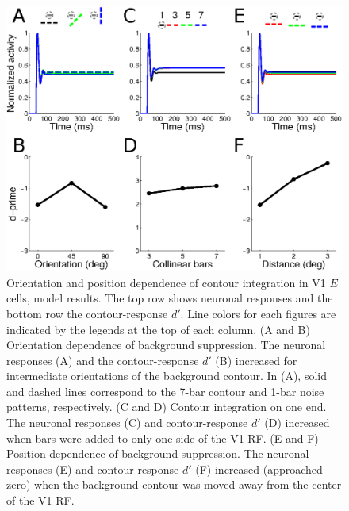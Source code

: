 \begin{figure}[t]
\begin{center}
\includegraphics[width=\textwidth]{Contour/figs/FigS2.eps}
\end{center}
\makeatletter
\let\@currsize\normalsize
\caption[Orientation and position dependence of contour integration in V1]{Orientation and position dependence of contour integration in
  V1 $E$ cells, model results. The top row shows neuronal responses
  and the bottom row the contour-response $d'$. Line colors for each
  figures are indicated by the legends at the top of each column. (A
  and B) Orientation dependence of background suppression. The
  neuronal responses (A) and the contour-response $d'$ (B) increased
  for intermediate orientations of the background contour.
  In (A), solid and
  dashed lines correspond to the 7-bar contour and 1-bar noise patterns, respectively.
  (C and D) Contour integration on one end. The neuronal responses (C)
  and contour-response $d'$ (D) increased when bars were added to only
  one side of the V1 RF. (E and F) Position dependence of background
  suppression.  The neuronal responses (E) and contour-response $d'$ (F) increased (approached zero) when the background contour was moved away from the center of the V1 RF.}
\label{Fig:V1_total}
\end{figure}

\clearpage


